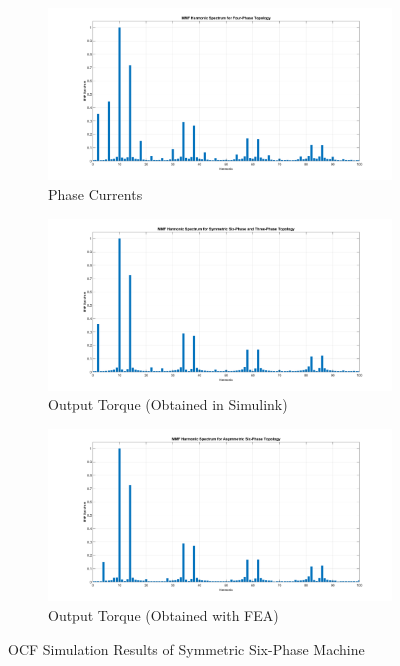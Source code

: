 \documentclass[a4paper,11pt]{article}
\begin{document}
\begin{figure}[ht!]
\begin{subfigure}[b]{0.33\textwidth}
    \centering
    \includegraphics[width=\linewidth]{mmf_harm_4ph.png}
    \caption{Phase Currents}
    \label{fig:ocfcurrent}    
\end{subfigure}
\begin{subfigure}[b]{0.33\textwidth}
    \centering
    \includegraphics[width=\linewidth]{mmf_harm_sym.png}
    \caption{Output Torque (Obtained in Simulink)}
    \label{fig:s6phmmf}    
\end{subfigure}
\begin{subfigure}[b]{0.33\textwidth}
    \centering
    \includegraphics[width=\linewidth]{mmf_harm_asym.png}
    \caption{Output Torque (Obtained with FEA)}
    \label{fig:as6phmmf}    
\end{subfigure}
 \caption{OCF Simulation Results of Symmetric Six-Phase Machine}
\end{figure}
\end{document}
